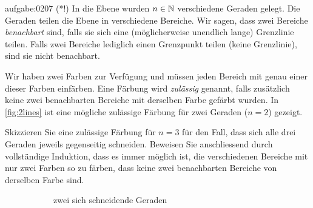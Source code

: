 \begin{aufgabe}{aufgabe:0207}
(*!) In die Ebene wurden $n\in\mathbb{N}$ verschiedene Geraden gelegt. Die Geraden teilen die Ebene in verschiedene Bereiche. Wir sagen, dass zwei Bereiche \textit{benachbart} sind, falls sie sich eine (möglicherweise unendlich lange) Grenzlinie teilen. Falls zwei Bereiche lediglich einen Grenzpunkt teilen (keine Grenzlinie), sind sie nicht benachbart.

Wir haben zwei Farben zur Verfügung und müssen jeden Bereich mit genau einer dieser Farben einfärben. Eine Färbung wird \textit{zulässig} genannt, falls zusätzlich keine zwei benachbarten Bereiche mit derselben Farbe gefärbt wurden. In \cref{fig:2lines} ist eine mögliche zulässige Färbung für zwei Geraden ($n=2$) gezeigt.

Skizzieren Sie eine zulässige Färbung für $n=3$ für den Fall, dass sich alle drei Geraden jeweils gegenseitig schneiden. Beweisen Sie anschliessend durch vollständige Induktion, dass es immer möglich ist, die verschiedenen Bereiche mit nur zwei Farben so zu färben, dass keine zwei benachbarten Bereiche von derselben Farbe sind.

\begin{figure}[H]
    \centering
    \begin{subfigure}{0.4\textwidth}
        \centering
        \caption{zwei sich schneidende Geraden}
        \label{subfig:2linesNotFilled}
    \end{subfigure}
    \hfill
    \begin{subfigure}{0.4\textwidth}
        \centering
\end{subfigure}
\end{figure}
\end{aufgabe}
